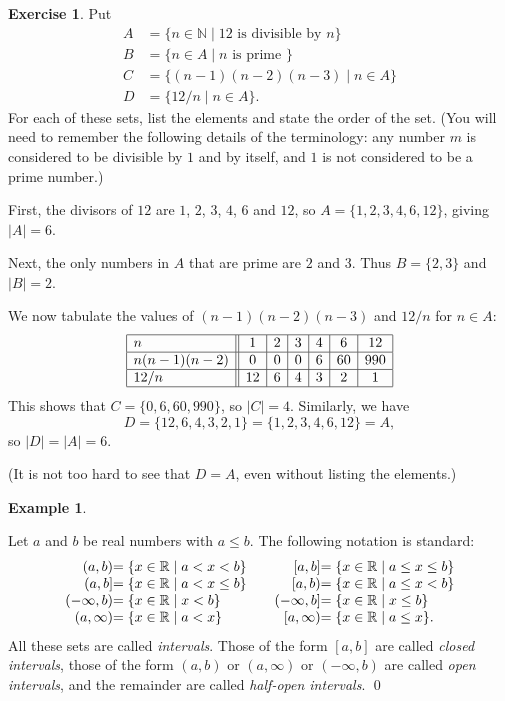 \documentclass[a4paper]{book}
\newcommand{\PURPLE}[1]{{\color{purple}#1}}
\newcommand{\N}         {{\mathbb{N}}}
\newcommand{\R}         {{\mathbb{R}}}
\newcommand{\st}        {\;|\;}
\renewcommand{\:}{\colon}
\newcommand{\bilabel}[1]{\hypertarget{#1}{\label{#1}}}
\newcommand{\DEFN}[1]{\PURPLE{\emph{#1}}}
\theoremstyle{definition}
\newtheorem{example}[theorem]{Example}
\newtheorem{exercise}[theorem]{Exercise}
\renewenvironment{solution}{\SolutionInline}{\endSolutionInline}
\begin{document}
\begin{exercise}
 Put
 \begin{align*}
  A &= \{ n\in\N \st 12 \text{ is divisible by } n\} \\
  B &= \{ n\in A\st n \text{ is prime }\} \\
  C &= \{ (n-1)(n-2)(n-3) \st n\in A\} \\
  D &= \{ 12/n \st n\in A\}.
 \end{align*}
 For each of these sets, list the elements and state the order of the
 set.  (You will need to remember the following details of the
 terminology: any number $m$ is considered to be divisible by $1$ and
 by itself, and $1$ is not considered to be a prime number.)
\end{exercise}
\begin{solution}
 First, the divisors of $12$ are $1$, $2$, $3$, $4$, $6$ and $12$, so
 $A=\{1,2,3,4,6,12\}$, giving $|A|=6$.

 Next, the only numbers in $A$ that are prime are $2$ and $3$.  Thus
 $B=\{2,3\}$ and $|B|=2$.

 We now tabulate the values of $(n-1)(n-2)(n-3)$ and $12/n$ for
 $n\in A$: 
 \[ \begin{array}{|l||c|c|c|c|c|c|}
   \hline
    n           &  1 &  2 &  3 &  4 &  6 & 12  \\ \hline
    n(n-1)(n-2) &  0 &  0 &  0 &  6 & 60 & 990 \\ \hline
    12/n        & 12 &  6 &  4 &  3 &  2 &  1  \\ \hline
 \end{array} \]
 This shows that $C=\{0,6,60,990\}$, so $|C|=4$.  Similarly, we have 
 \[ D = \{12,6,4,3,2,1\} = \{1,2,3,4,6,12\} = A, \]
 so $|D|=|A|=6$.

 (It is not too hard to see that $D=A$, even without listing the
 elements.)
\end{solution}

\begin{example}\bilabel{eg-intervals}
 Let $a$ and $b$ be real numbers with $a\leq b$.  The following
 notation is standard:
 \[ \setlength{\arraycolsep}{0em} 
  \begin{array}{rlcrl}
  (a,b) &= \{x\in\R\st a<x<b\} &\hspace{2em}&
  [a,b] &= \{x\in\R\st a\leq x\leq b\} \\
  (a,b] &= \{x\in\R\st a<x\leq b\} &&
  [a,b) &= \{x\in\R\st a\leq x<b\} \\
  (-\infty,b) &= \{x\in\R \st x<b\} &&
  (-\infty,b] &= \{x\in\R \st x\leq b\} \\
  (a,\infty)  &= \{x\in\R \st a<x\} &&
  [a,\infty)  &= \{x\in\R \st a\leq x\}.
 \end{array} \]
 All these sets are called \DEFN{intervals}.  Those of the form
 $[a,b]$ are called \DEFN{closed intervals}, those of the form $(a,b)$
 or $(a,\infty)$ or $(-\infty,b)$ are called \DEFN{open intervals},
 and the remainder are called \DEFN{half-open intervals}. \qed
\end{example}
\end{document}
